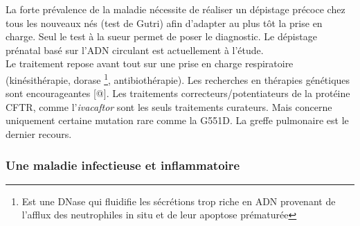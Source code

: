 \documentclass[12pt,a4paper]{article}
\begin{document}
La forte prévalence de la maladie nécessite de réaliser un dépistage précoce chez tous les nouveaux nés (test de Gutri) afin d’adapter au plus tôt la prise en charge. Seul le test à la sueur permet de poser le diagnostic. Le dépistage prénatal basé sur l’ADN circulant est actuellement à l’étude.\\   
Le traitement repose avant tout sur une prise en charge respiratoire (kinésithérapie, dorase \footnote{Est une DNase qui fluidifie les sécrétions trop riche en ADN provenant de l'afflux des neutrophiles in situ et de leur apoptose prématurée}, antibiothérapie). Les recherches en thérapies génétiques sont encourageantes [@].
Les traitements correcteurs/potentiateurs de la protéine CFTR, comme l'\textit{ivacaftor} sont les seuls traitements curateurs. Mais concerne uniquement certaine mutation rare comme la G551D. La greffe pulmonaire est le dernier recours.

\subsubsection{Une maladie infectieuse et inflammatoire}
\end{document}
